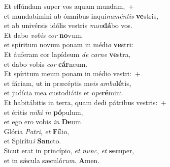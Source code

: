 \evenverse Et effúndam super vos aquam mundam,~+\\\evenverse  et mundabímini ab ómnibus inqui\textit{na}\textit{mén}\textit{tis} \textbf{ve}stris,~\*\\
\evenverse et ab univérsis idólis vestris \textit{mun}\textbf{dá}bo vos.\\
\oddverse Et dabo \textit{vo}\textit{bis} \textit{cor} \textbf{no}vum,~\*\\
\oddverse et spíritum novum ponam in médi\textit{o} \textbf{ve}stri:\\
\evenverse Et áuferam cor lapídeum \textit{de} \textit{car}\textit{ne} \textbf{ve}stra,~\*\\
\evenverse et dabo vobis \textit{cor} \textbf{cár}neum.\\
\oddverse Et spíritum meum ponam in médio vestri:~+\\
\oddverse  et fáciam, ut in præcéptis me\textit{is} \textit{am}\textit{bu}\textbf{lé}tis,~\*\\
\oddverse et judícia mea custodiátis et o\textit{pe}\textbf{ré}mini.\\
\evenverse Et habitábitis in terra, quam dedi pátribus vestris:~+\\
\evenverse  et éritis \textit{mi}\textit{hi} \textit{in} \textbf{pó}pulum,~\*\\
\evenverse et ego ero vobis \textit{in} \textbf{De}um.\\
\oddverse Glória \textit{Pa}\textit{tri}, \textit{et} \textbf{Fí}lio,~\*\\
\oddverse et Spirítu\textit{i} \textbf{San}cto.\\
\evenverse Sicut erat in princípio, \textit{et} \textit{nunc}, \textit{et} \textbf{sem}per,~\*\\
\evenverse et in sǽcula sæculó\textit{rum}. \textbf{A}men.\\
